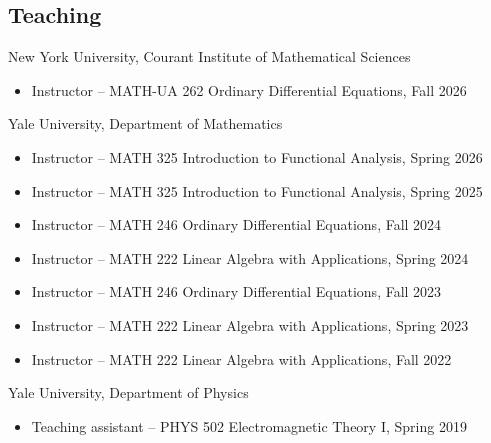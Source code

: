 \documentclass[margin,line,pifont,palatino,courier]{res}
\begin{document}
\begin{resume}
\section{\sc Teaching}
New York University, Courant Institute of Mathematical Sciences

\begin{itemize}
\setlength\itemsep{0em}
	\item Instructor -- MATH-UA 262 Ordinary Differential Equations, Fall 2026
\end{itemize}
Yale University, Department of Mathematics

\begin{itemize}
\setlength\itemsep{0em}
	\item Instructor -- MATH 325 Introduction to Functional Analysis, Spring 2026
	\item Instructor -- MATH 325 Introduction to Functional Analysis, Spring 2025
	\item Instructor -- MATH 246 Ordinary Differential Equations, Fall 2024
		\item Instructor -- MATH 222 Linear Algebra with Applications, Spring 2024
	\item Instructor -- MATH 246 Ordinary Differential Equations, Fall 2023
	\item Instructor -- MATH 222 Linear Algebra with Applications, Spring 2023
	\item Instructor -- MATH 222 Linear Algebra with Applications, Fall 2022

\end{itemize}
Yale University, Department of Physics

\begin{itemize}
\setlength\itemsep{0em}
	\item Teaching assistant -- PHYS 502 Electromagnetic Theory I, Spring 2019
\end{itemize}



\end{resume}
\end{document}
